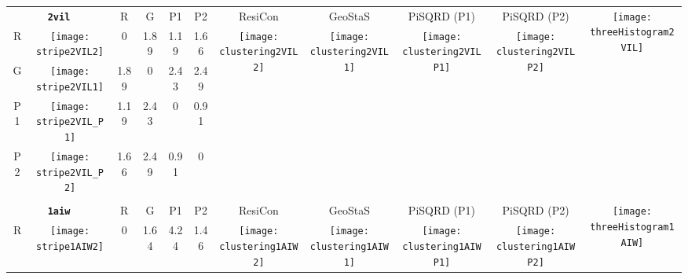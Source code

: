 \documentclass[a4paper,11pt,twoside]{book}%
\begin{document}
\begin{appendices}
\begin{sidewaystable}[h!]
\sffamily
\begin{tabular*}{4cm}{cc|c|c|c|c|c|c|c|c|c|}
\cline{1-11}
\multicolumn{2}{|c|}{{\bf \texttt{2vil}}} & R & G & P1 & P2 & ResiCon & GeoStaS & PiSQRD (P1) & PiSQRD (P2) & \multirow{5}{*}{\vspace{-0.15cm}\texttt{[image: threeHistogram2VIL]}}  \\
\cline{1-10}
\multicolumn{1}{|c|}{R} & \texttt{[image: stripe2VIL2]} & 0 & 1.89 & 1.19 & 1.66 & \multirow{4}{*}{\vspace{-0.3cm}\texttt{[image: clustering2VIL2]}} & \multirow{4}{*}{\vspace{-0.3cm}\texttt{[image: clustering2VIL1]}} & \multirow{4}{*}{\vspace{-0.3cm}\texttt{[image: clustering2VILP1]}} & \multirow{4}{*}{\vspace{-0.3cm}\texttt{[image: clustering2VILP2]}} &  \multirow{5}{*}{} \\
\cline{1-6}
\multicolumn{1}{|c|}{G} & \texttt{[image: stripe2VIL1]} & 1.89 & 0 & 2.43 & 2.49 & \multirow{4}{*}{} & \multirow{4}{*}{} & \multirow{4}{*}{} & \multirow{4}{*}{} & \multirow{5}{*}{} \\
\cline{1-6}
\multicolumn{1}{|c|}{P1} & \texttt{[image: stripe2VIL\_P1]} & 1.19 & 2.43 & 0 & 0.91 & \multirow{4}{*}{} & \multirow{4}{*}{} & \multirow{4}{*}{} & \multirow{4}{*}{} & \multirow{5}{*}{}  \\
\cline{1-6}
\multicolumn{1}{|c|}{P2} & \texttt{[image: stripe2VIL\_P2]} & 1.66 & 2.49 & 0.91 & 0 & \multirow{4}{*}{} & \multirow{4}{*}{} & \multirow{4}{*}{} & \multirow{4}{*}{} & \multirow{5}{*}{}  \\
\cline{1-11}
\\
\cline{1-11}
\multicolumn{2}{|c|}{{\bf \texttt{1aiw}}} & R & G & P1 & P2 & ResiCon & GeoStaS & PiSQRD (P1) & PiSQRD (P2) & \multirow{5}{*}{\vspace{-0.15cm}\texttt{[image: threeHistogram1AIW]}}  \\
\cline{1-10}
\multicolumn{1}{|c|}{R} & \texttt{[image: stripe1AIW2]} & 0 & 1.64 & 4.24 & 1.46 & \multirow{4}{*}{\vspace{-0.3cm}\texttt{[image: clustering1AIW2]}} & \multirow{4}{*}{\vspace{-0.3cm}\texttt{[image: clustering1AIW1]}} & \multirow{4}{*}{\vspace{-0.3cm}\texttt{[image: clustering1AIWP1]}} & \multirow{4}{*}{\vspace{-0.3cm}\texttt{[image: clustering1AIWP2]}} &  \multirow{5}{*}{} \\

\end{tabular*}
\end{sidewaystable}
\end{appendices}
\end{document}
